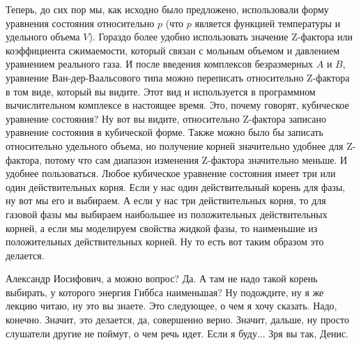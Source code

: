 \documentclass[main.tex]{subfiles}
\begin{document}
Теперь, до сих пор мы, как исходно было предложено, использовали форму уравнения состояния относительно $p$ (что $p$ является функцией температуры и удельного объема $V$).
Гораздо более удобно использовать значение Z-фактора или коэффициента сжимаемости, который связан с мольным объемом и давлением уравнением реального газа.
И после введения комплексов безразмерных $A$ и $B$, уравнение Ван-дер-Ваальсового типа можно переписать относительно Z-фактора в том виде, который вы видите.
Этот вид и используется в программном вычислительном комплексе в настоящее время.
Это, почему говорят, кубическое уравнение состояния?
Ну вот вы видите, относительно Z-фактора записано уравнение состояния в кубической форме.
Также можно было бы записать относительно удельного объема, но получение корней значительно удобнее для Z-фактора, потому что сам диапазон изменения Z-фактора значительно меньше.
И удобнее пользоваться.
Любое кубическое уравнение состояния имеет три или один действительных корня.
Если у нас один действительный корень для фазы, ну вот мы его и выбираем.
А если у нас три действительных корня, то для газовой фазы мы выбираем наибольшее из положительных действительных корней, а если мы моделируем свойства жидкой фазы, то наименьшие из положительных действительных корней.
Ну то есть вот таким образом это делается.

Александр Иосифович, а можно вопрос?
Да.
А там не надо такой корень выбирать, у которого энергия Гиббса наименьшая?
Ну подождите, ну я же лекцию читаю, ну это вы знаете.
Это следующее, о чем я хочу сказать.
Надо, конечно.
Значит, это делается, да, совершенно верно.
Значит, дальше, ну просто слушатели другие не поймут, о чем речь идет.
Если я буду... Зря вы так, Денис.
\end{document}

